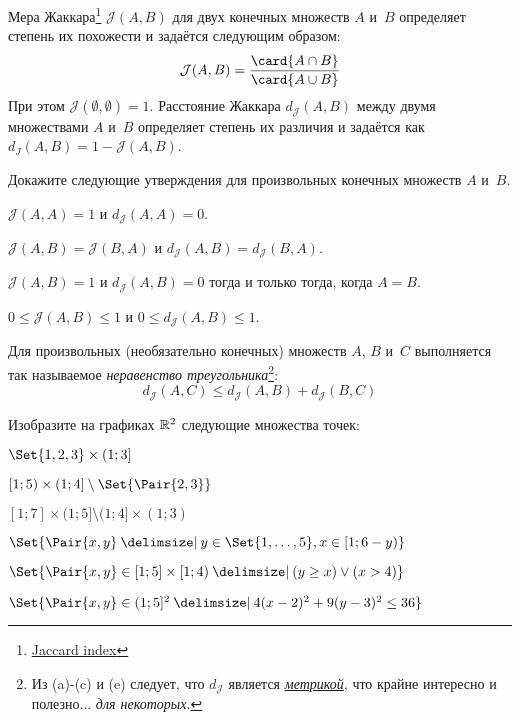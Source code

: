 \documentclass[a4paper,12pt]{article}
\newcommand{\Jaccard}{\mathcal{J}}
\newcommand{\JaccardDist}{d_{\Jaccard}}
\begin{document}
\begin{tasks}
    \item Мера Жаккара\footnote{\href{https://en.wikipedia.org/wiki/Jaccard_index}{Jaccard index}} $\Jaccard(A, B)$ для двух конечных множеств $A$ и~$B$ определяет степень их похожести и задаётся следующим образом:
    \[
        \Jaccard(A, B) = \frac{\card{A \intersection B}}{\card{A \union B}}
    \]
    При этом $\Jaccard(\emptyset, \emptyset) = 1$.
    Расстояние Жаккара $\JaccardDist(A,B)$ между двумя множествами $A$ и~$B$ определяет степень их различия и задаётся как $d_J(A,B) = 1 - \Jaccard(A,B)$.

    Докажите следующие утверждения для произвольных конечных множеств $A$ и~$B$.

    \begin{subtasks}
        \item $\Jaccard(A,A) = 1$ и $\JaccardDist(A,A) = 0$.
        \item $\Jaccard(A,B) = \Jaccard(B, A)$ и $\JaccardDist(A,B) = \JaccardDist(B, A)$.
        \item $\Jaccard(A,B) = 1$ и $\JaccardDist(A,B) = 0$ тогда и только тогда, когда $A = B$.
        \item $0 \leq \Jaccard(A,B) \leq 1$ и $0 \leq \JaccardDist(A,B) \leq 1$.
        \item Для произвольных (необязательно конечных) множеств $A$, $B$ и~$C$ выполняется так называемое \emph{неравенство треугольника}\footnote{Из (a)-(c) и (e) следует, что $\JaccardDist$ является \href{https://en.wikipedia.org/wiki/Metric_space}{\emph{метрикой}}, что крайне интересно и полезно... \textit{для некоторых}.}:
        \[
            \JaccardDist(A,C) \leq \JaccardDist(A,B) + \JaccardDist(B,C)
        \]
    \end{subtasks}


    \item Изобразите на графиках $\mathbb{R}^2$ следующие множества точек:

    \begin{multicols}{2}
    \begin{subtasks}
        \item $\Set{1,2,3} \times (1; 3]$
        \item $[1; 5) \times (1; 4] \setminus \Set{\Pair{2, 3}}$
        \item $[1; 7] \times (1;5] \setminus (1;4] \times (1;3)$
        \item $\Set{\Pair{x,y} \given y \in \Set{1,\dots,5}, x \in [1; 6-y)}$
        \item $\Set{\Pair{x, y} \in [1; 5] \times [1; 4) \given (y \geq x) \lor (x > 4)}$
        \item $\Set{\Pair{x, y} \in (1;5]^2 \given 4(x-2)^2 + 9(y-3)^2 \leq 36}$
    \end{subtasks}
    \end{multicols}



\end{tasks}
\end{document}
